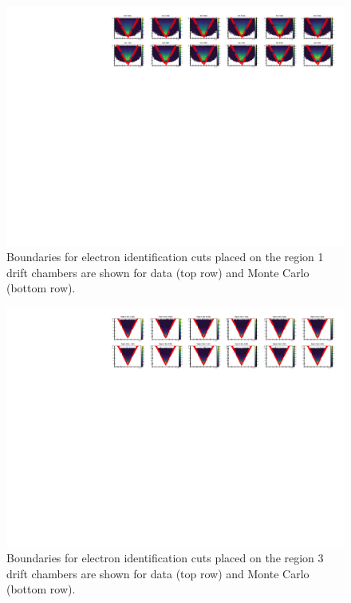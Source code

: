 \begin{figure}
  \centering
  \label{fig:systematics-region1}
  \includegraphics[width=\textwidth]{image/plots/sidis/systematics/region1.pdf}
  \caption[Systematic boundaries on region 1]{Boundaries for electron identification cuts placed on the region 1 drift chambers are shown for data (top row) and Monte Carlo (bottom row).}
\end{figure}

\begin{figure}
  \centering
  \label{fig:systematics-region3}
  \includegraphics[width=\textwidth]{image/plots/sidis/systematics/region3.pdf}
  \caption[Systematic boundaries on region 3]{Boundaries for electron identification cuts placed on the region 3 drift chambers are shown for data (top row) and Monte Carlo (bottom row).}
\end{figure}

